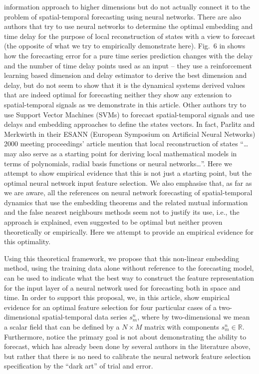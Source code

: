\documentclass[journal]{IEEEtran}
\begin{document}
information approach to higher dimensions but do not actually connect it to the problem of spatial-temporal forecasting using neural networks. 
There are also authors \cite{articleRagulskis} that try to use neural networks to determine the optimal embedding and time 
delay for the purpose of local reconstruction of states with a view to forecast (the opposite of what we try to empirically demonstrate 
here). Fig.\ 6 in \cite{1555956} shows how the forecasting error for a pure time series prediction changes with the delay and the number of 
time delay points used as an input -- they use a reinforcement learning based dimension and delay estimator to derive the best dimension 
and delay, but do not seem to show that it is the dynamical systems derived values that are indeed optimal for forecasting neither
they show any extension to spatial-temporal signals as we demonstrate in this article.
Other authors \cite{Xia2006APF} try to use Support Vector Machines (SVMs) to forecast spatial-temporal signals and use delays and 
embedding approaches to define the states vectors. In fact, Parlitz and Merkwirth \cite{Parlitz2000NonlinearPO} in their
ESANN (European Symposium on Artificial Neural Networks) 2000 meeting proceedings' article mention
 that local reconstruction of states ``\ldots may also serve as
a starting point for deriving local mathematical models in terms of polynomials,
radial basis functions or neural networks\ldots''. Here we attempt to show empirical evidence that this is not just
a starting point, but the optimal neural network input feature selection. We also emphasise that,
 as far as we are aware, all the references on neural network forecasting of spatial-temporal dynamics that use the 
embedding theorems and the related mutual information and the false nearest neighbours methods seem not to justify its use, i.e., 
the approach is explained, even suggested to be optimal but neither proven theoretically or empirically. Here we attempt 
to provide an empirical evidence for this optimality. 

Using this theoretical framework, we propose that this non-linear 
embedding method, using the training data alone without reference to the forecasting model, 
can be used to indicate what the best way to construct the feature representation for 
the input layer of a neural network used for forecasting both in space and time.
In order to support this proposal, we, in this article, show empirical evidence for an optimal feature selection 
 for four particular cases of a two-dimensional
spatial-temporal data series $s^n_m$, where by two-dimensional we mean a scalar field that can be
defined by a $N \times M$ matrix with components $s^n_m \in \mathbb{R}$. Furthermore, notice the primary goal is not about demonstrating 
the ability to forecast, which has already been done by several authors in the literature above, but rather that there is no need to calibrate
the neural network feature selection specification by the ``dark art'' of trial and error.
 
\end{document}

